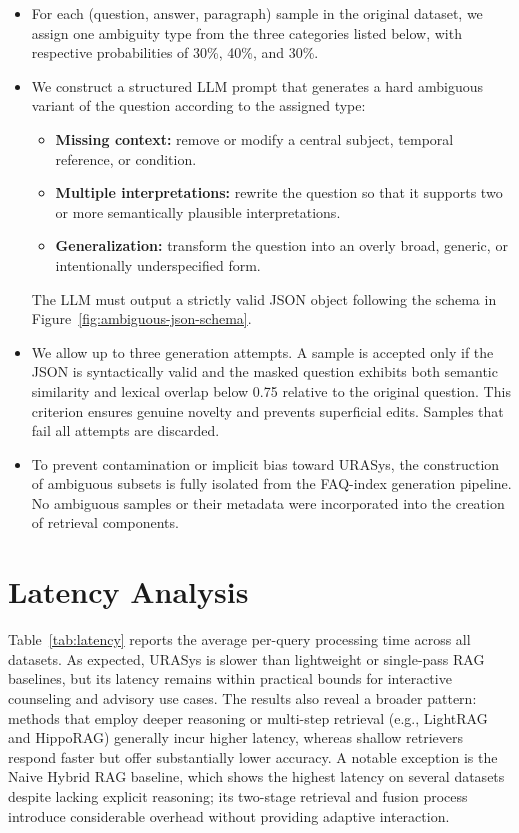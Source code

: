 \documentclass[11pt]{article}
\begin{document}
\begin{itemize}
    \item For each (question, answer, paragraph) sample in the original dataset, we assign one ambiguity type from the three categories listed below, with respective probabilities of 30\%, 40\%, and 30\%.
    
    \item We construct a structured LLM prompt that generates a hard ambiguous variant of the question according to the assigned type:
    \begin{itemize}
        \item \textbf{Missing context:} remove or modify a central subject, temporal reference, or condition.
        \item \textbf{Multiple interpretations:} rewrite the question so that it supports two or more semantically plausible interpretations.
        \item \textbf{Generalization:} transform the question into an overly broad, generic, or intentionally underspecified form.
    \end{itemize}
    The LLM must output a strictly valid JSON object following the schema in Figure~\ref{fig:ambiguous-json-schema}.
    
    \item We allow up to three generation attempts. A sample is accepted only if the JSON is syntactically valid and the masked question exhibits both semantic similarity and lexical overlap below 0.75 relative to the original question. This criterion ensures genuine novelty and prevents superficial edits. Samples that fail all attempts are discarded.
    
    \item To prevent contamination or implicit bias toward URASys, the construction of ambiguous subsets is fully isolated from the FAQ-index generation pipeline. No ambiguous samples or their metadata were incorporated into the creation of retrieval components.
\end{itemize}

\section{Latency Analysis}
\label{sec:latency}

Table~\ref{tab:latency} reports the average per-query processing time across all datasets. As expected, URASys is slower than lightweight or single-pass RAG baselines, but its latency remains within practical bounds for interactive counseling and advisory use cases. The results also reveal a broader pattern: methods that employ deeper reasoning or multi-step retrieval (e.g., LightRAG and HippoRAG) generally incur higher latency, whereas shallow retrievers respond faster but offer substantially lower accuracy. A notable exception is the Naive Hybrid RAG baseline, which shows the highest latency on several datasets despite lacking explicit reasoning; its two-stage retrieval and fusion process introduce considerable overhead without providing adaptive interaction.
\end{document}
